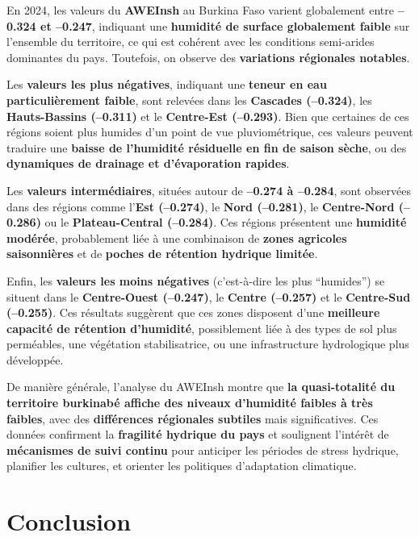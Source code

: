\documentclass[
]{book}
\begin{document}
En 2024, les valeurs du \textbf{AWEInsh} au Burkina Faso varient globalement entre \textbf{--0.324 et --0.247}, indiquant une \textbf{humidité de surface globalement faible} sur l'ensemble du territoire, ce qui est cohérent avec les conditions semi-arides dominantes du pays. Toutefois, on observe des \textbf{variations régionales notables}.

Les \textbf{valeurs les plus négatives}, indiquant une \textbf{teneur en eau particulièrement faible}, sont relevées dans les \textbf{Cascades (--0.324)}, les \textbf{Hauts-Bassins (--0.311)} et le \textbf{Centre-Est (--0.293)}. Bien que certaines de ces régions soient plus humides d'un point de vue pluviométrique, ces valeurs peuvent traduire une \textbf{baisse de l'humidité résiduelle en fin de saison sèche}, ou des \textbf{dynamiques de drainage et d'évaporation rapides}.

Les \textbf{valeurs intermédiaires}, situées autour de \textbf{--0.274 à --0.284}, sont observées dans des régions comme l'\textbf{Est (--0.274)}, le \textbf{Nord (--0.281)}, le \textbf{Centre-Nord (--0.286)} ou le \textbf{Plateau-Central (--0.284)}. Ces régions présentent une \textbf{humidité modérée}, probablement liée à une combinaison de \textbf{zones agricoles saisonnières} et de \textbf{poches de rétention hydrique limitée}.

Enfin, les \textbf{valeurs les moins négatives} (c'est-à-dire les plus ``humides'') se situent dans le \textbf{Centre-Ouest (--0.247)}, le \textbf{Centre (--0.257)} et le \textbf{Centre-Sud (--0.255)}. Ces résultats suggèrent que ces zones disposent d'une \textbf{meilleure capacité de rétention d'humidité}, possiblement liée à des types de sol plus perméables, une végétation stabilisatrice, ou une infrastructure hydrologique plus développée.

De manière générale, l'analyse du AWEInsh montre que \textbf{la quasi-totalité du territoire burkinabé affiche des niveaux d'humidité faibles à très faibles}, avec des \textbf{différences régionales subtiles} mais significatives. Ces données confirment la \textbf{fragilité hydrique du pays} et soulignent l'intérêt de \textbf{mécanismes de suivi continu} pour anticiper les périodes de stress hydrique, planifier les cultures, et orienter les politiques d'adaptation climatique.

\section{Conclusion}\label{conclusion-1}
\end{document}
